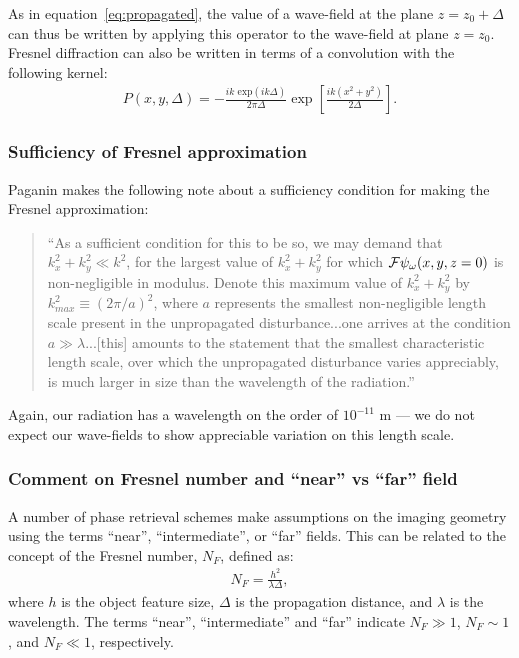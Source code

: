 \documentclass{article}
\begin{document}
As in equation~\ref{eq:propagated}, the value of a wave-field at the plane
$z=z_0 + \Delta$ can thus be written by applying this operator to the wave-field
at plane $z=z_0$. Fresnel diffraction can also be written in terms of a
convolution with the following kernel:
\begin{align}
  P(x,y,\Delta) = -\frac{ik\text{ exp}(ik\Delta)}{2\pi\Delta}\exp\left[\frac{ik(x^2 + y^2)}{2\Delta}\right].
\end{align}

\subsubsection{Sufficiency of Fresnel approximation}

Paganin makes the following note about a sufficiency condition for making the
Fresnel approximation:
\begin{quote}
  ``As a sufficient condition for this to be so, we may demand that
  $k_x^2 + k_y^2 \ll k^2$, for the largest value of $k_x^2 + k_y^2$ for which
  $\mathcal{F}\psi_{\omega}(x,y,z=0)$ is non-negligible in modulus. Denote
  this maximum value of $k_x^2 + k_y^2$ by $k_{max}^2 \equiv (2\pi/a)^2$, where
  $a$ represents the smallest non-negligible length scale present in the
  unpropagated disturbance...one arrives at the condition $a \gg \lambda$...[this]
  amounts to the statement that the smallest characteristic length scale, over which
  the unpropagated disturbance varies appreciably, is much larger in size
  than the wavelength of the radiation.''
\end{quote}

Again, our radiation has a wavelength on the order of $10^{-11}$ m --- we do not
expect our wave-fields to show appreciable variation on this length scale.

\subsubsection{Comment on Fresnel number and ``near'' vs ``far'' field}

A number of phase retrieval schemes make assumptions on the imaging geometry
using the terms ``near'', ``intermediate'', or ``far'' fields.  This can be
related to the concept of the Fresnel number, $N_F$, defined as:
\begin{align}
  N_F = \frac{h^2}{\lambda\Delta},
  \label{eq:NF}
\end{align}
where $h$ is the object feature size, $\Delta$ is the propagation distance, and
$\lambda$ is the wavelength. The terms ``near'', ``intermediate'' and ``far''
indicate $N_F \gg 1$, $N_F \sim 1$, and $N_F \ll 1$, respectively.
\end{document}
